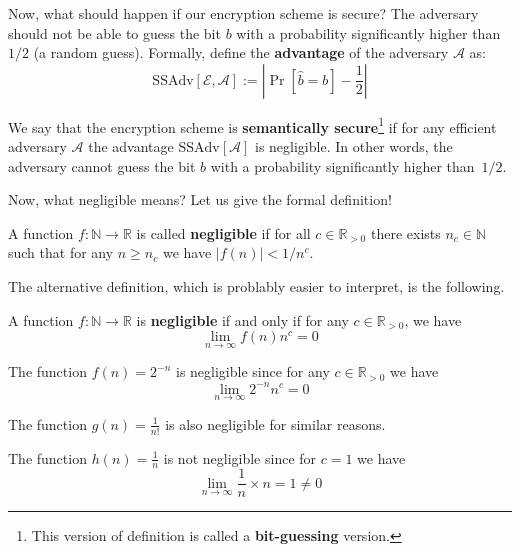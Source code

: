 \documentclass[../lecture-notes-148x210.tex]{subfiles}
\begin{document}
Now, what should happen if our encryption scheme is secure? The adversary should not be able to guess the bit $b$ with a probability significantly higher than $1/2$ (a random guess). Formally, define the 
\textbf{advantage} of the adversary $\mathcal{A}$ as:
\begin{equation*}
    \text{SSAdv}[\mathcal{E}, \mathcal{A}] := \left| \Pr[\hat{b} = b] - \frac{1}{2} \right|
\end{equation*}

We say that the encryption scheme is \textbf{semantically secure}\footnote{This version of definition is called a 
\textbf{bit-guessing} version.} if for any efficient adversary $\mathcal{A}$ the advantage $\text{SSAdv}[\mathcal{A}]$ 
is negligible. In other words, the adversary cannot guess the bit $b$ with a probability significantly higher than~$1/2$.

Now, what negligible means? Let us give the formal definition!

\begin{definition}
    A function $f: \mathbb{N} \to \mathbb{R}$ is called \textbf{negligible} if for all $c \in \mathbb{R}_{>0}$ there exists $n_c \in \mathbb{N}$ such that for any $n \geq n_c$ we have $|f(n)| < 1/n^c$.
\end{definition}

The alternative definition, which is problably easier to interpret, is the following.

\begin{theorem}
    A function $f: \mathbb{N} \to \mathbb{R}$ is \textbf{negligible} if and only if for any $c \in \mathbb{R}_{>0}$, we have
    \begin{equation*}
        \lim_{n \to \infty} f(n)n^c = 0
    \end{equation*}
\end{theorem}

\begin{example}
    The function $f(n) = 2^{-n}$ is negligible since for any $c \in \mathbb{R}_{>0}$ we have
    \begin{equation*}
        \lim_{n \to \infty} 2^{-n}n^c = 0
    \end{equation*}

    The function $g(n) = \frac{1}{n!}$ is also negligible for similar reasons.
\end{example}

\begin{example}
    The function $h(n) = \frac{1}{n}$ is not negligible since for $c = 1$ we have
    \begin{equation*}
        \lim_{n \to \infty} \frac{1}{n} \times n = 1 \neq 0
    \end{equation*}
\end{example}
\end{document}
